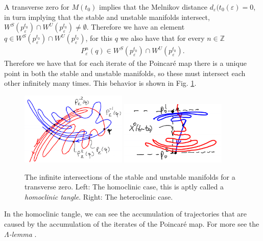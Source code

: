 A transverse zero for $M(t_0)$ implies that the Melnikov distance $d_{\varepsilon }(t_{0}(\varepsilon)=0$, in turn implying that the stable and unstable manifolds intersect, $W^{S}(p_{\varepsilon}^{t_0}) \cap W^{U}(p_{\varepsilon}^{t_0}) \neq \emptyset$. Therefore we have an element $q\in W^{S}(p_{\varepsilon}^{t_0}) \cap W^{U}(p_{\varepsilon}^{t_0})$, for this $q$ we also have that for every $n \in \mathbb{Z}$
\begin{align}
	P_{\varepsilon}^{n}(q) \in W^{S}(p_{\varepsilon}^{t_0}) \cap W^{U}(p_{\varepsilon}^{t_0}). 
\end{align}
Therefore we have that for each iterate of the Poincaré map there is a unique point in both the stable and unstable manifolds, so these must intersect each other infinitely many times. This behavior is shown in Fig. \ref{fig:inf_intersections}. 
\begin{figure}[h!]
	\centering
	\includegraphics[width=0.45\textwidth]{figures/ch6/11inf_intersection_hetero.png}
	\includegraphics[width=0.45\textwidth]{figures/ch6/11inf_intersection_homo.png}
	\caption{The infinite intersections of the stable and unstable manifolds for a transverse zero. Left: The homoclinic case, this is aptly called a \emph{homoclinic tangle}. Right: The heteroclinic case.}
	\label{fig:inf_intersections}
\end{figure}
In the homoclinic tangle, we can see the accumulation of trajectories that are caused by the accumulation of the iterates of the Poincaré map. For more see the \emph{$\Lambda$-lemma} \cite{PalisPhd, Palis}.

